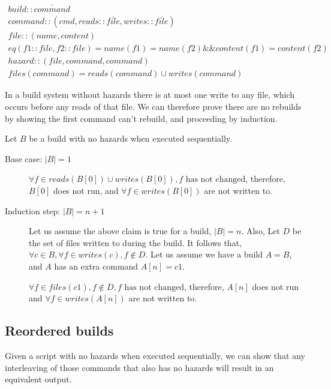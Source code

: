 \begin{align} 
  build :: \bar{command} \\
  command :: (cmd, reads :: \bar{file}, writes:: \bar{file}) \\
  file :: (name, content) \\
  eq(f1 :: file, f2 :: file) = name(f1) = name(f2) \&\& content(f1) = content(f2) \\
  hazard :: (file, command, command) \\
  files(command) = reads(command) \cup writes(command)
\end{align}

In a build system without hazards there is at most one write to any file, which occurs before any reads of that file. We can therefore prove there are no rebuilds by showing the first command can't rebuild, and proceeding by induction.

Let $B$ be a build with no hazards when executed sequentially.

\begin{description}
\item[Base case: $|B| = 1$]

  $\forall f \in reads(B[0]) \cup writes(B[0]), f \text{ has not changed}$, therefore, $B[0]$ does not run, and $\forall f \in writes(B[0])$ are not written to.
  
  
\item[Induction step: $|B| = n+1$]
  Let us assume the above claim is true for a build, $|B| = n$.  Also, Let $D$ be the set of files written to during the build.
  It follows that, $\forall c \in B, \forall f \in writes(c), f \notin D$.
  Let us assume we have a build $A=B$, and $A$ has an extra command $A[n]=c1$.  
  
  $\forall f \in files(c1), f \notin D, f \text{ has not changed}$, therefore, $A[n]$ does not run and $\forall f \in writes(A[n])$ are not written to.
  
\end{description}

\subsection{Reordered builds}
\label{sec:proof:reorder}

Given a script with no hazards when executed sequentially, we can show that any interleaving of those commands that also has no hazards will result in an equivalent output.

